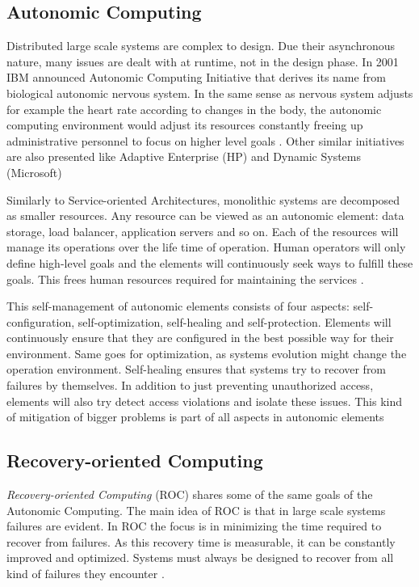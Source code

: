 \documentclass{tktltiki}
\begin{document}
\subsection{Autonomic Computing}

Distributed large scale systems are complex to design.  Due their asynchronous nature, many issues are dealt with at runtime, not in the design phase.  In 2001 IBM announced Autonomic Computing Initiative that derives its name from biological autonomic nervous system.  In the same sense as nervous system adjusts for example the heart rate according to changes in the body, the autonomic computing environment would adjust its resources constantly freeing up administrative personnel to focus on higher level goals \cite{autonomic_vision}.  Other similar initiatives are also presented like Adaptive Enterprise (HP) and Dynamic Systems (Microsoft) \cite{autonomic_research}

Similarly to Service-oriented Architectures, monolithic systems are decomposed as smaller resources.  Any resource can be viewed as an autonomic element: data storage, load balancer, application servers and so on.  Each of the resources will manage its operations over the life time of operation.  Human operators will only define high-level goals and the elements will continuously seek ways to fulfill these goals.  This frees human resources required for maintaining the services \cite{autonomic_research}.

This self-management of autonomic elements consists of four aspects: self-configuration, self-optimization, self-healing and self-protection.  Elements will continuously ensure that they are configured in the best possible way for their environment.  Same goes for optimization, as systems evolution might change the operation environment.  Self-healing ensures that systems try to recover from failures by themselves.  In addition to just preventing unauthorized access, elements will also try detect access violations and isolate these issues.  This kind of mitigation of bigger problems is part of all aspects in autonomic elements \cite{autonomic_research, autonomic_vision}



\subsection{Recovery-oriented Computing}

\emph{Recovery-oriented Computing} (ROC) shares some of the same goals of the Autonomic Computing.  The main idea of ROC is that in large scale systems failures are evident.  In ROC the focus is in minimizing the time required to recover from failures.  As this recovery time is measurable, it can be constantly improved and optimized.  Systems must always be designed to recover from all kind of failures they encounter \cite{ROC}.
\end{document}
